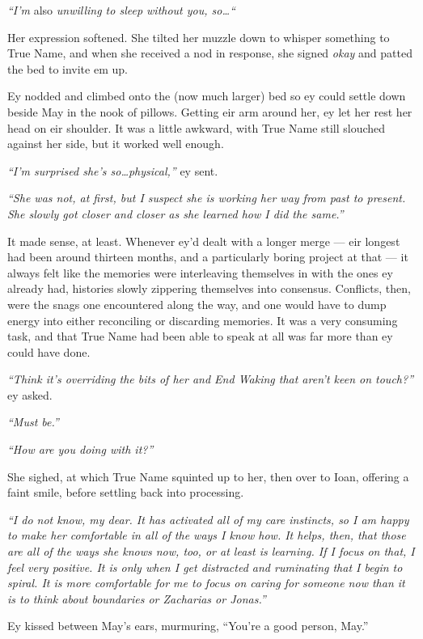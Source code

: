 \emph{``I'm} also \emph{unwilling to sleep without you, so\ldots``}

Her expression softened. She tilted her muzzle down to whisper something to True Name, and when she received a nod in response, she signed \emph{okay} and patted the bed to invite em up.

Ey nodded and climbed onto the (now much larger) bed so ey could settle down beside May in the nook of pillows. Getting eir arm around her, ey let her rest her head on eir shoulder. It was a little awkward, with True Name still slouched against her side, but it worked well enough.

\emph{``I'm surprised she's so\ldots physical,''} ey sent.

\emph{``She was not, at first, but I suspect she is working her way from past to present. She slowly got closer and closer as she learned how I did the same.''}

It made sense, at least. Whenever ey'd dealt with a longer merge — eir longest had been around thirteen months, and a particularly boring project at that — it always felt like the memories were interleaving themselves in with the ones ey already had, histories slowly zippering themselves into consensus. Conflicts, then, were the snags one encountered along the way, and one would have to dump energy into either reconciling or discarding memories. It was a very consuming task, and that True Name had been able to speak at all was far more than ey could have done.

\emph{``Think it's overriding the bits of her and End Waking that aren't keen on touch?''} ey asked.

\emph{``Must be.''}

\emph{``How are you doing with it?''}

She sighed, at which True Name squinted up to her, then over to Ioan, offering a faint smile, before settling back into processing.

\emph{``I do not know, my dear. It has activated all of my care instincts, so I am happy to make her comfortable in all of the ways I know how. It helps, then, that those are all of the ways she knows now, too, or at least is learning. If I focus on that, I feel very positive. It is only when I get distracted and ruminating that I begin to spiral. It is more comfortable for me to focus on caring for someone now than it is to think about boundaries or Zacharias or Jonas.''}

Ey kissed between May's ears, murmuring, ``You're a good person, May.''

